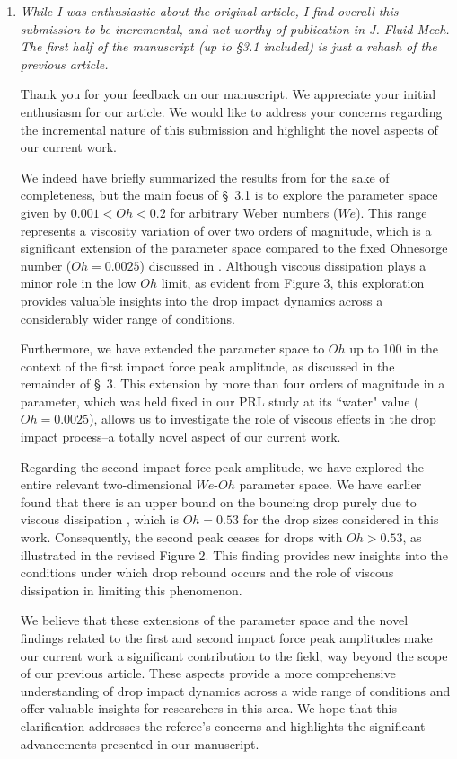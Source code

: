 \documentclass[]{article}
\begin{document}
\begin{enumerate}
	\item \textit{While I was enthusiastic about the original article, I find overall this submission to be incremental, and not worthy of publication in J. Fluid Mech. The first half of the manuscript (up to §3.1 included) is just a rehash of the previous article.}
	
	Thank you for your feedback on our manuscript. We appreciate your initial enthusiasm for our article. We would like to address your concerns regarding the incremental nature of this submission and highlight the novel aspects of our current work.
	
	We indeed have briefly summarized the results from \citet{zhang2022impact} for the sake of completeness, but the main focus of \S~3.1 is to explore the parameter space given by $0.001 < Oh < 0.2$ for arbitrary Weber numbers ($We$). This range represents a viscosity variation of over two orders of magnitude, which is a significant extension of the parameter space compared to the fixed Ohnesorge number ($Oh = 0.0025$) discussed in \citet{zhang2022impact}. Although viscous dissipation plays a minor role in the low $Oh$ limit, as evident from Figure 3, this exploration provides valuable insights into the drop impact dynamics across a considerably wider range of conditions.
	
	Furthermore, we have extended the parameter space to $Oh$ up to 100 in the context of the first impact force peak amplitude, as discussed in the remainder of \S~3. This extension by more than four orders of magnitude in a parameter, which was held fixed in our PRL study at its ``water" value ($Oh = 0.0025$), allows us to investigate the role of viscous effects in the drop impact process--a totally novel aspect of our current work.
	
	Regarding the second impact force peak amplitude, we have explored the entire relevant two-dimensional $We$-$Oh$ parameter space. We have earlier found that there is an upper bound on the bouncing drop purely due to viscous dissipation \citep{sanjay_chantelot_lohse_2023}, which is $Oh = 0.53$ for the drop sizes considered in this work. Consequently, the second peak ceases for drops with $Oh > 0.53$, as illustrated in the revised Figure 2. This finding provides new insights into the conditions under which drop rebound occurs and the role of viscous dissipation in limiting this phenomenon.
	
	We believe that these extensions of the parameter space and the novel findings related to the first and second impact force peak amplitudes make our current work a significant contribution to the field, way beyond the scope of our previous article. These aspects provide a more comprehensive understanding of drop impact dynamics across a wide range of conditions and offer valuable insights for researchers in this area.
	We hope that this clarification addresses the referee's concerns and highlights the significant advancements presented in our manuscript.
	

\end{enumerate}
\end{document}
